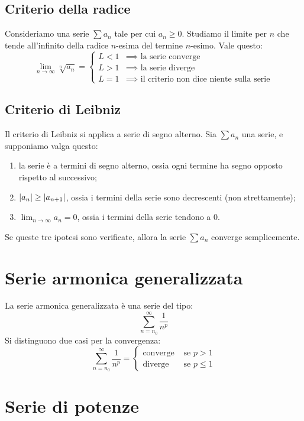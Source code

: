 \subsection{Criterio della radice}

Consideriamo una serie $\sum a_n$ tale per cui $a_n \ge 0$. Studiamo il 
limite per $n$ che tende all'infinito della radice $n$-esima del termine
$n$-esimo. Vale questo:
\[
\lim_{n \to \infty} \sqrt[n]{a_n} =
\begin{cases}
L < 1 &\implies \text{ la serie converge} \\
L > 1 &\implies \text{ la serie diverge} \\
L = 1 &\implies \text{ il criterio non dice niente sulla serie}
\end{cases}
\]

\subsection{Criterio di Leibniz}

Il criterio di Leibniz si applica a serie di segno alterno.
Sia $\sum a_n$ una serie, e supponiamo valga questo:
\begin{enumerate}
    \item la serie \`e a termini di segno alterno, ossia ogni termine
    ha segno opposto rispetto al successivo;
    \item $\left\lvert{a_n}\right\rvert \ge \left\lvert{a_{n+1}}\right\rvert$, ossia i termini della serie
    sono decrescenti (non strettamente);
    \item $\lim_{n \to \infty} a_n = 0$, ossia i termini della serie 
    tendono a 0.
\end{enumerate}
Se queste tre ipotesi sono verificate, allora la serie $\sum a_n$ converge
semplicemente.

\section{Serie armonica generalizzata}

La serie armonica generalizzata \`e una serie del tipo:
\[
\sum_{n = n_0}^{\infty} \frac{1}{n^p}
\]
Si distinguono due casi per la convergenza:
\[
\sum_{n = n_0}^{\infty} \frac{1}{n^p} =
\begin{cases}
\text{converge } &  \text{se } p > 1 \\
\text{diverge } & \text{se } p \le 1
\end{cases}
\]

\section{Serie di potenze}

